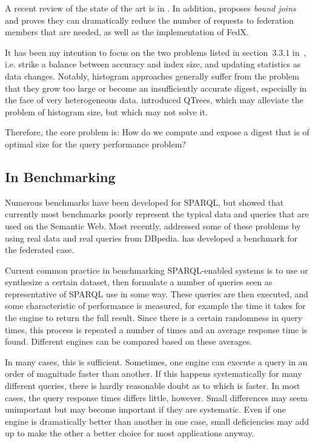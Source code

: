 \documentclass{llncs}
\begin{document}
A recent review of the state of the art is in
\cite{springerlink:10.1007/978-3-642-17551-0-5}. In addition,
\cite{springerlink:10.1007/978-3-642-25073-6-38} proposes
\emph{bound joins} and proves they can dramatically reduce the number of
requests to federation members that are needed, as well as the implementation of
FedX.

It has been my intention to focus on the two problems listed in
section~3.3.1
in~\cite{springerlink:10.1007/978-3-642-17551-0-5}, i.e. strike a
balance between accuracy and index size, and updating statistics as
data changes. Notably, histogram
approaches generally suffer from the problem that they grow too large
or become an insufficiently accurate digest, especially in the face of
very heterogeneous data.  \cite{Harth:2010:DSO:1772690.1772733}
introduced QTrees, which may alleviate the problem of histogram size,
but which may not solve it.

Therefore, the core problem is: How do we compute and expose a digest that
is of optimal size for the query performance problem?

\subsection{In Benchmarking}

Numerous benchmarks have been developed for SPARQL, but
\cite{Duan:2011:AOC:1989323.1989340} showed that currently most
benchmarks poorly represent the typical data and queries that are used
on the Semantic Web.
Most recently, \cite{mxro:Morsey2011DBpedia} addressed some of these
problems by using real data and real queries from
DBpedia. \cite{Schmidt:2011:FBS:2063016.2063054} has developed a
benchmark for the federated case.

Current common practice in benchmarking SPARQL-enabled systems is to
use or synthesize a certain dataset, then formulate a number of
queries seen as representative of SPARQL use in some way. These
queries are then executed, and some characteristic of performance is
measured, for example the time it takes for the engine to return the
full result. Since there is a certain randomness in query times, this
process is repeated a number of times and an average response time is
found. Different engines can be compared based on these averages.

In many cases, this is sufficient. Sometimes, one engine can execute a
query in an order of magnitude faster than another. If this happens
systematically for many different queries, there is hardly reasonable
doubt as to which is faster. In most cases, the query response times
differs little, however. Small differences may seem unimportant
but may become important if they are systematic. Even if one engine is
dramatically better than another in one case, small deficiencies may
add up to make the other a better choice for most applications anyway.
\end{document}
